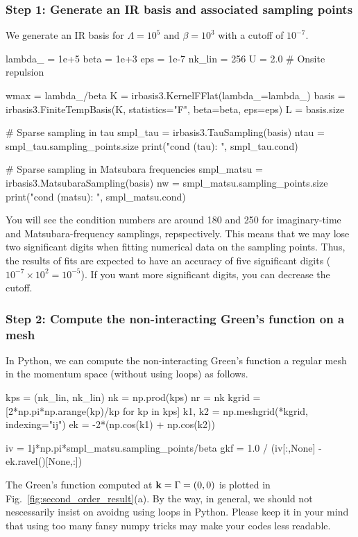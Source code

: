 \documentclass[submission, LectureNotes]{SciPost}
\newcommand{\bk}{\ensuremath{{\bf k}}}
\begin{document}
\subsubsection*{Step 1: Generate an IR basis and associated sampling points}
We generate an IR basis for $\Lambda=10^5$ and $\beta=10^3$ with a cutoff of $10^{-7}$.
\begin{python}
lambda_ = 1e+5
beta = 1e+3
eps = 1e-7
nk_lin = 256
U = 2.0 # Onsite repulsion

wmax = lambda_/beta
K = irbasis3.KernelFFlat(lambda_=lambda_)
basis = irbasis3.FiniteTempBasis(K, statistics="F", beta=beta, eps=eps)
L = basis.size

# Sparse sampling in tau
smpl_tau = irbasis3.TauSampling(basis)
ntau = smpl_tau.sampling_points.size
print("cond (tau): ", smpl_tau.cond)

# Sparse sampling in Matsubara frequencies
smpl_matsu = irbasis3.MatsubaraSampling(basis)
nw = smpl_matsu.sampling_points.size
print("cond (matsu): ", smpl_matsu.cond)
\end{python}
You will see the condition numbers are around 180 and 250 for imaginary-time and Matsubara-frequency samplings,
repspectively.
This means that we may lose two significant digits when fitting numerical data on the sampling points.
Thus, the results of fits are expected to have an accuracy of five significant digits ($10^{-7} \times 10^2 = 10^{-5}$).
If you want more significant digits, you can decrease the cutoff.

\subsubsection*{Step 2: Compute the non-interacting Green's function on a mesh}
In Python, we can compute the non-interacting Green's function a regular mesh in 
the momentum space (without using loops) as follows.
\begin{python}
kps = (nk_lin, nk_lin)
nk = np.prod(kps)
nr = nk
kgrid = [2*np.pi*np.arange(kp)/kp for kp in kps]
k1, k2 = np.meshgrid(*kgrid, indexing="ij")
ek = -2*(np.cos(k1) + np.cos(k2))

iv = 1j*np.pi*smpl_matsu.sampling_points/beta
gkf = 1.0 / (iv[:,None] - ek.ravel()[None,:])
\end{python}
The Green's function computed at $\bk=\Gamma=(0,0)$ is plotted in Fig.~\ref{fig:second_order_result}(a).
By the way, in general, we should not nescessarily insist on avoidng using loops in Python.
Please keep it in your mind that using too many fansy numpy tricks may make your codes less readable.
\end{document}
